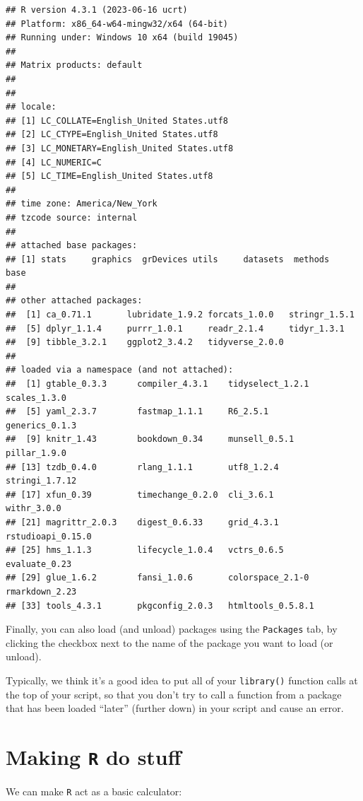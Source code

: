 \documentclass[
]{book}
\begin{document}
\begin{verbatim}
## R version 4.3.1 (2023-06-16 ucrt)
## Platform: x86_64-w64-mingw32/x64 (64-bit)
## Running under: Windows 10 x64 (build 19045)
## 
## Matrix products: default
## 
## 
## locale:
## [1] LC_COLLATE=English_United States.utf8 
## [2] LC_CTYPE=English_United States.utf8   
## [3] LC_MONETARY=English_United States.utf8
## [4] LC_NUMERIC=C                          
## [5] LC_TIME=English_United States.utf8    
## 
## time zone: America/New_York
## tzcode source: internal
## 
## attached base packages:
## [1] stats     graphics  grDevices utils     datasets  methods   base     
## 
## other attached packages:
##  [1] ca_0.71.1       lubridate_1.9.2 forcats_1.0.0   stringr_1.5.1  
##  [5] dplyr_1.1.4     purrr_1.0.1     readr_2.1.4     tidyr_1.3.1    
##  [9] tibble_3.2.1    ggplot2_3.4.2   tidyverse_2.0.0
## 
## loaded via a namespace (and not attached):
##  [1] gtable_0.3.3      compiler_4.3.1    tidyselect_1.2.1  scales_1.3.0     
##  [5] yaml_2.3.7        fastmap_1.1.1     R6_2.5.1          generics_0.1.3   
##  [9] knitr_1.43        bookdown_0.34     munsell_0.5.1     pillar_1.9.0     
## [13] tzdb_0.4.0        rlang_1.1.1       utf8_1.2.4        stringi_1.7.12   
## [17] xfun_0.39         timechange_0.2.0  cli_3.6.1         withr_3.0.0      
## [21] magrittr_2.0.3    digest_0.6.33     grid_4.3.1        rstudioapi_0.15.0
## [25] hms_1.1.3         lifecycle_1.0.4   vctrs_0.6.5       evaluate_0.23    
## [29] glue_1.6.2        fansi_1.0.6       colorspace_2.1-0  rmarkdown_2.23   
## [33] tools_4.3.1       pkgconfig_2.0.3   htmltools_0.5.8.1
\end{verbatim}

Finally, you can also load (and unload) packages using the \texttt{Packages} tab, by clicking the checkbox next to the name of the package you want to load (or unload).

Typically, we think it's a good idea to put all of your \texttt{library()} function calls at the top of your script, so that you don't try to call a function from a package that has been loaded ``later'' (further down) in your script and cause an error.

\hypertarget{making-r-do-stuff}{%
\section{\texorpdfstring{Making \texttt{R} do stuff}{Making R do stuff}}\label{making-r-do-stuff}}

We can make \texttt{R} act as a basic calculator:
\end{document}
